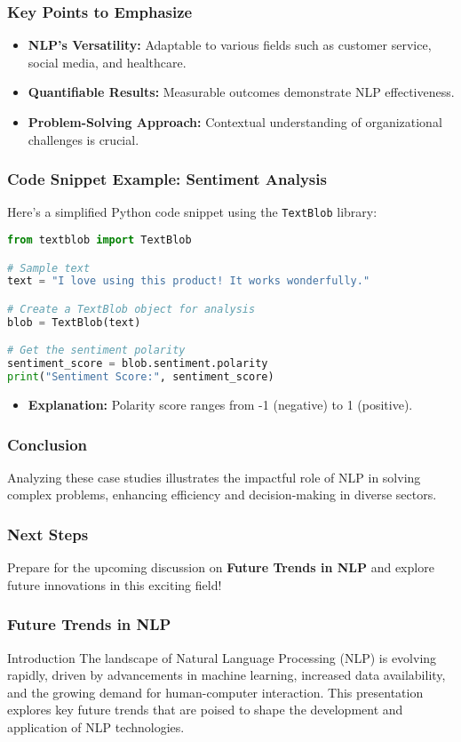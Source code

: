 \documentclass[aspectratio=169]{beamer}
\begin{document}
\begin{frame}
    \frametitle{Key Points to Emphasize}
    \begin{itemize}
        \item \textbf{NLP's Versatility:} Adaptable to various fields such as customer service, social media, and healthcare.
        \item \textbf{Quantifiable Results:} Measurable outcomes demonstrate NLP effectiveness.
        \item \textbf{Problem-Solving Approach:} Contextual understanding of organizational challenges is crucial.
    \end{itemize}
\end{frame}

\begin{frame}[fragile]
    \frametitle{Code Snippet Example: Sentiment Analysis}
    Here’s a simplified Python code snippet using the \texttt{TextBlob} library:
    \begin{lstlisting}[language=Python]
from textblob import TextBlob

# Sample text
text = "I love using this product! It works wonderfully."

# Create a TextBlob object for analysis
blob = TextBlob(text)

# Get the sentiment polarity
sentiment_score = blob.sentiment.polarity
print("Sentiment Score:", sentiment_score)
    \end{lstlisting}
    \begin{itemize}
        \item \textbf{Explanation:} Polarity score ranges from -1 (negative) to 1 (positive).
    \end{itemize}
\end{frame}

\begin{frame}
    \frametitle{Conclusion}
    Analyzing these case studies illustrates the impactful role of NLP in solving complex problems, 
    enhancing efficiency and decision-making in diverse sectors.
\end{frame}

\begin{frame}
    \frametitle{Next Steps}
    Prepare for the upcoming discussion on \textbf{Future Trends in NLP} and explore future innovations in this exciting field!
\end{frame}

\begin{frame}[fragile]
    \frametitle{Future Trends in NLP}
    \begin{block}{Introduction}
        The landscape of Natural Language Processing (NLP) is evolving rapidly, driven by advancements in machine learning, increased data availability, and the growing demand for human-computer interaction. This presentation explores key future trends that are poised to shape the development and application of NLP technologies.
    \end{block}
\end{frame}
\end{document}
